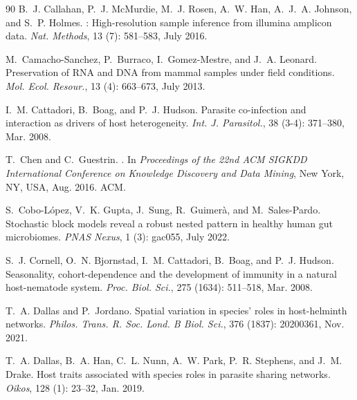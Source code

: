 \documentclass[oneside, a4paper, onecolumn, 11pt]{article}
\begin{document}
\begin{thebibliography}{90}
B.~J. Callahan, P.~J. McMurdie, M.~J. Rosen, A.~W. Han, A.~J.~A. Johnson, and S.~P. Holmes.
: High-resolution sample inference from illumina amplicon data.
\newblock \emph{Nat. Methods}, 13 (7): 581--583, July 2016.

M.~Camacho-Sanchez, P.~Burraco, I.~Gomez-Mestre, and J.~A. Leonard.
\newblock Preservation of {RNA} and {DNA} from mammal samples under field conditions.
\newblock \emph{Mol. Ecol. Resour.}, 13 (4): 663--673, July 2013.

I.~M. Cattadori, B.~Boag, and P.~J. Hudson.
\newblock Parasite co-infection and interaction as drivers of host heterogeneity.
\newblock \emph{Int. J. Parasitol.}, 38 (3-4): 371--380, Mar. 2008.

T.~Chen and C.~Guestrin.
.
\newblock In \emph{Proceedings of the 22nd ACM SIGKDD International Conference on Knowledge Discovery and Data Mining}, New York, NY, USA, Aug. 2016. ACM.

S.~Cobo-López, V.~K. Gupta, J.~Sung, R.~Guimerà, and M.~Sales-Pardo.
\newblock Stochastic block models reveal a robust nested pattern in healthy human gut microbiomes.
\newblock \emph{PNAS Nexus}, 1 (3): gac055, July 2022.

S.~J. Cornell, O.~N. Bjornstad, I.~M. Cattadori, B.~Boag, and P.~J. Hudson.
\newblock Seasonality, cohort-dependence and the development of immunity in a natural host-nematode system.
\newblock \emph{Proc. Biol. Sci.}, 275 (1634): 511--518, Mar. 2008.

T.~A. Dallas and P.~Jordano.
\newblock Spatial variation in species' roles in host-helminth networks.
\newblock \emph{Philos. Trans. R. Soc. Lond. B Biol. Sci.}, 376 (1837): 20200361, Nov. 2021.

T.~A. Dallas, B.~A. Han, C.~L. Nunn, A.~W. Park, P.~R. Stephens, and J.~M. Drake.
\newblock Host traits associated with species roles in parasite sharing networks.
\newblock \emph{Oikos}, 128 (1): 23--32, Jan. 2019.


\end{thebibliography}
\end{document}
